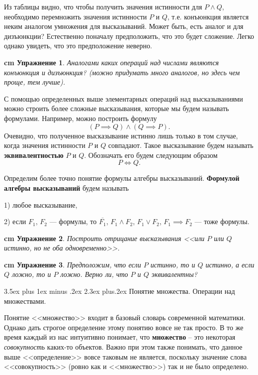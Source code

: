 \documentclass[12pt, russian]{article}
\makeatletter
\renewcommand\subsection{\@startsection {subsection}{2}{\parindent}%
{3.5ex plus 1ex minus .2ex}%
{2.3ex plus.2ex}%
{\normalfont\large\bfseries}}
\newtheorem{exercise}{\hskip 0.5 cm Упражнение}%
\makeatother
\begin{document}
Из таблицы видно, что чтобы получить значения истинности для $P \wedge Q$, необходимо перемножить значения истинности $P$ и $Q$, т.е. конъюнкция является неким аналогом умножения для высказываний. Может быть, есть аналог и для дизъюнкции? Естественно поначалу предположить, что это будет сложение. Легко однако увидеть, что это предположение неверно.

\begin{exercise}
	Аналогами каких операций над числами являются конъюнкция и дизъюнкция? (можно придумать много аналогов, но здесь чем проще, тем лучше).
\end{exercise}

С помощью определенных выше элементарных операций над высказываниями можно строить более сложные высказывания, которые мы будем называть формулами.  Например, можно построить формулу
$$
(P \implies Q) \wedge (Q \implies P).
$$
Очевидно, что полученное высказывание истинно лишь только в том случае, когда значения истинности $P$ и $Q$ совпадают. Такое высказывание будем называть \textbf{эквивалентностью} $P$ и $Q$. Обозначать его будем следующим образом
$$
P  \Longleftrightarrow  Q.
$$

Определим более точно понятие формулы алгебры высказываний.
\textbf{ Формулой алгебры высказываний} будем называть

1) любое высказывание,

2) если $F_1$, $F_2$ --- формулы, то $\overline{F_1}$, $F_1 \wedge F_2$, $F_1 \vee F_2$, $F_1 \implies F_2$ --- тоже формулы.

\begin{exercise}
	Построить отрицание высказывания <<или $P$ или $Q$ истинно, но не оба одновременно>>.
\end{exercise}
\begin{exercise}
	Предположим, что если $P$ истинно, то и $Q$ истинно, а если $Q$ ложно, то и $P$ ложно. Верно ли, что $P$ и $Q$ эквивалентны?
\end{exercise}


\subsection{Понятие множества. Операции над множествами.}

Понятие <<множество>> входит в базовый словарь современной математики. Однако дать строгое определение этому понятию вовсе не так просто. В то же время каждый из нас интуитивно понимает, что \textbf{множество} -- это некоторая \textit{совокупность} каких-то объектов. Важно при этом также понимать, что данное выше <<определение>> вовсе таковым не является, поскольку значение слова <<совокупность>> (ровно как и <<множество>>) так и не было определено.
\end{document}
